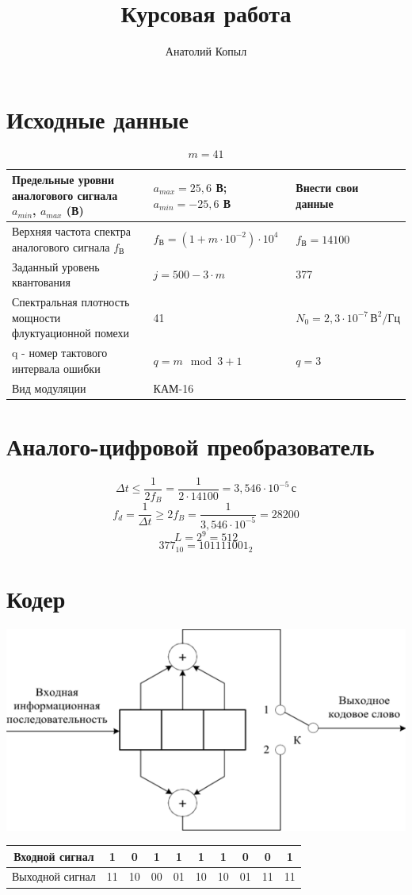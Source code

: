 \documentclass[a4paper, 12pt]{article}
\author{Анатолий Копыл}
\title{Курсовая работа}
\begin{document}
\section{Исходные данные}
\[ m=41 \]
\begin{center}
  \begin{tabular}{ | p{5cm} | p{5cm} | p{5cm} | } 
    \hline
    Предельные уровни аналогового сигнала \(a_{min}\), \(a_{max}\) (В) & \(a_{max}=25,6\) В;\newline\(a_{min}=-25,6\) В & Внести свои данные \\
    \hline
    Верхняя частота спектра аналогового сигнала \(f_В\) & \(f_В =(1+m\cdot 10^{-2})\cdot 10^4\) & \(f_В =14100\) \\ 
    \hline
    Заданный уровень квантования & \(j=500-3\cdot m\) & 377 \\
    \hline
    Спектральная плотность мощности флуктуационной помехи & 41 & \(N_0=2,3\cdot 10^{-7}\, В^2/Гц\)\\
    \hline
    q - номер тактового интервала ошибки & \(q=m\mod{3}+1\) & \(q=3\)\\
    \hline
    Вид модуляции & КАМ-16 & \\
    \hline
  \end{tabular}
\end{center}

\section{Аналого-цифровой преобразователь}
\[ \Delta t \leq \frac{1}{2f_B}=\frac1 {2\cdot 14100} = 3,546\cdot 10^{-5}\, с \]
\[ f_d=\frac{1}{\Delta t}\geq 2f_B=\frac{1}{3,546\cdot 10^{-5}}=28200 \]
\[ L=2^9 = 512 \]
\[ 377_{10}=101111001_2 \]

\section{Кодер}
\begin{center}
  \includegraphics[scale=0.8]{coder}

  \begin{tabular}{ | c | c | c | c | c | c | c | c | c | c | }
    \hline
    Входной сигнал &1&0&1&1&1&1&0&0&1\\
    \hline
    Выходной сигнал &11&10&00&01&10&10&01&11&11\\
    \hline
  \end{tabular}
\end{center}
\end{document}
